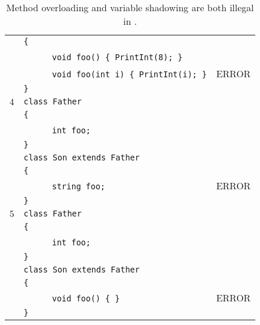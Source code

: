 \documentclass{article}
\begin{document}
\begin{table}[h]
\begin{tabular}{|l|l|l|}
     & \verb"{"                                       &       \\
     & ~ ~ ~ ~\verb"void foo() { PrintInt(8); }"      &       \\
     & ~ ~ ~ ~\verb"void foo(int i) { PrintInt(i); }" & ERROR \\
     & \verb"}"                                       &       \\
\hline
 $4$ & \verb"class Father"             &       \\
     & \verb"{"                        &       \\
     & ~ ~ ~ ~\verb"int foo;"          &       \\
     & \verb"}"                        &       \\
     & \verb"class Son extends Father" &       \\
     & \verb"{"                        &       \\
     & ~ ~ ~ ~\verb"string foo;"       & ERROR \\
     & \verb"}"                        &       \\
\hline
 $5$ & \verb"class Father"             &       \\
     & \verb"{"                        &       \\
     & ~ ~ ~ ~\verb"int foo;"          &       \\
     & \verb"}"                        &       \\
     & \verb"class Son extends Father" &       \\
     & \verb"{"                        &       \\
     & ~ ~ ~ ~\verb"void foo() { }"       & ERROR \\
     & \verb"}"                        &       \\
\hline
\end{tabular}
\caption{Method overloading and variable shadowing are both illegal in \plname.
\label{Table_Code_Examples_Overload_Override}}
\end{table}
\end{document}
